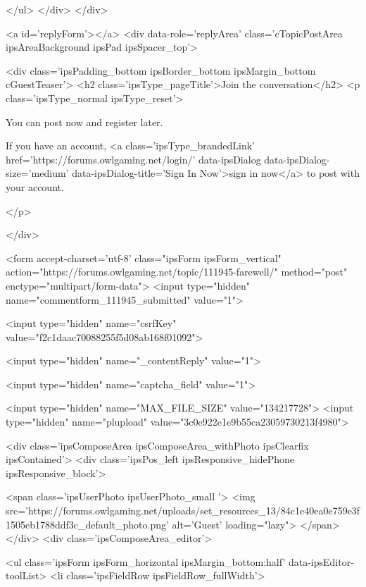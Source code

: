 		
	</ul>
</div>
		</div>
	

	
		<a id='replyForm'></a>
		<div data-role='replyArea' class='cTopicPostArea ipsAreaBackground ipsPad  ipsSpacer_top'>
			
				
				

	
		<div class='ipsPadding_bottom ipsBorder_bottom ipsMargin_bottom cGuestTeaser'>
			<h2 class='ipsType_pageTitle'>Join the conversation</h2>
			<p class='ipsType_normal ipsType_reset'>
	
				
					You can post now and register later.
				
				If you have an account, <a class='ipsType_brandedLink' href='https://forums.owlgaming.net/login/' data-ipsDialog data-ipsDialog-size='medium' data-ipsDialog-title='Sign In Now'>sign in now</a> to post with your account.
				
			</p>
	
		</div>
	


<form accept-charset='utf-8' class="ipsForm ipsForm_vertical" action="https://forums.owlgaming.net/topic/111945-farewell/" method="post" enctype="multipart/form-data">
	<input type="hidden" name="commentform_111945_submitted" value="1">
	
		<input type="hidden" name="csrfKey" value="f2c1daac70088255f5d08ab168f01092">
	
		<input type="hidden" name="_contentReply" value="1">
	
		<input type="hidden" name="captcha_field" value="1">
	
	
		<input type="hidden" name="MAX_FILE_SIZE" value="134217728">
		<input type="hidden" name="plupload" value="3c0e922e1e9b55ca23059730213f4980">
	
	<div class='ipsComposeArea ipsComposeArea_withPhoto ipsClearfix ipsContained'>
		<div class='ipsPos_left ipsResponsive_hidePhone ipsResponsive_block'>

	<span class='ipsUserPhoto ipsUserPhoto_small '>
		<img src='https://forums.owlgaming.net/uploads/set_resources_13/84c1e40ea0e759e3f1505eb1788ddf3c_default_photo.png' alt='Guest' loading="lazy">
	</span>
</div>
		<div class='ipsComposeArea_editor'>
			
				
					
				
					
						<ul class='ipsForm ipsForm_horizontal ipsMargin_bottom:half' data-ipsEditor-toolList>
							<li class='ipsFieldRow ipsFieldRow_fullWidth'>
								




